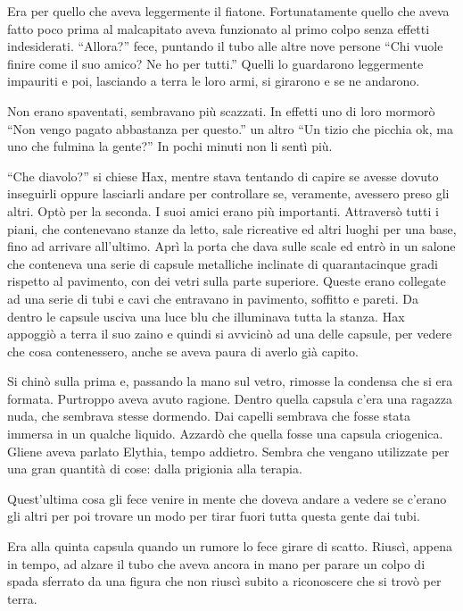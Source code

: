     Era per quello che aveva leggermente il fiatone. Fortunatamente quello
    che aveva fatto poco prima al malcapitato aveva funzionato al primo
    colpo senza effetti indesiderati. ``Allora?'' fece, puntando il tubo
    alle altre nove persone ``Chi vuole finire come il suo amico? Ne ho per
    tutti.'' Quelli lo guardarono leggermente impauriti e poi, lasciando a
    terra le loro armi, si girarono e se ne andarono.

    Non erano spaventati, sembravano più scazzati. In effetti uno di loro
    mormorò ``Non vengo pagato abbastanza per questo.'' un altro ``Un tizio
    che picchia ok, ma uno che fulmina la gente?'' In pochi minuti non li
    sentì più.

    ``Che diavolo?'' si chiese Hax, mentre stava tentando di capire se
    avesse dovuto inseguirli oppure lasciarli andare per controllare se,
    veramente, avessero preso gli altri. Optò per la seconda. I suoi amici
    erano più importanti. Attraversò tutti i piani, che contenevano stanze
    da letto, sale ricreative ed altri luoghi per una base, fino ad
    arrivare all'ultimo. Aprì la porta che dava sulle scale ed entrò in un
    salone che conteneva una serie di capsule metalliche inclinate di
    quarantacinque gradi rispetto al pavimento, con dei vetri sulla parte
    superiore. Queste erano collegate ad una serie di tubi e cavi che
    entravano in pavimento, soffitto e pareti. Da dentro le capsule usciva una luce blu che illuminava
    tutta la stanza. Hax appoggiò a terra il suo zaino e quindi si avvicinò ad una delle capsule, per vedere che
    cosa contenessero, anche se aveva paura di averlo già capito.

    Si chinò sulla prima e, passando la mano sul vetro, rimosse la condensa
    che si era formata. Purtroppo aveva avuto ragione. Dentro quella
    capsula c'era una ragazza nuda, che sembrava stesse dormendo. Dai
    capelli sembrava che fosse stata immersa in un qualche liquido. Azzardò
    che quella fosse una capsula criogenica. Gliene aveva parlato Elythia,
    tempo addietro. Sembra che vengano utilizzate per una gran quantità di
    cose: dalla prigionia alla terapia.

    Quest'ultima cosa gli fece venire in mente che doveva andare a vedere
    se c'erano gli altri per poi trovare un modo per tirar fuori tutta
    questa gente dai tubi.

    Era alla quinta capsula quando un rumore lo fece girare di scatto.
    Riuscì, appena in tempo, ad alzare il tubo che aveva ancora in mano per
    parare un colpo di spada sferrato da una figura che non riuscì subito a
    riconoscere che si trovò per terra.

